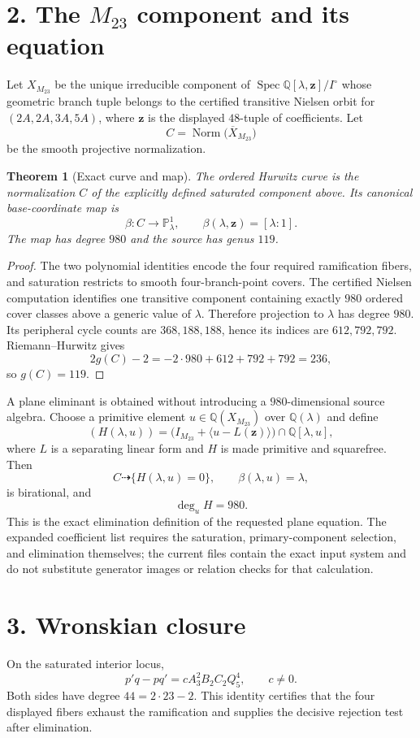 \documentclass[11pt]{article}
\newtheorem{theorem}{Theorem}
\newcommand{\Q}{\mathbb Q}
\newcommand{\Pone}{\mathbb P^1}
\newcommand{\Spec}{\operatorname{Spec}}
\newcommand{\Norm}{\operatorname{Norm}}
\begin{document}
\section*{2. The $M_{23}$ component and its equation}
Let $X_{M_{23}}$ be the unique irreducible component of
$\Spec\Q[\lambda,\mathbf z]/I^{\circ}$ whose geometric branch tuple belongs
to the certified transitive Nielsen orbit for $(2A,2A,3A,5A)$, where
$\mathbf z$ is the displayed $48$-tuple of coefficients.  Let
\[
 C=\Norm\bigl(\overline{X}_{M_{23}}\bigr)
\]
be the smooth projective normalization.

\begin{theorem}[Exact curve and map]
The ordered Hurwitz curve is the normalization $C$ of the explicitly defined
saturated component above.  Its canonical base-coordinate map is
\[
 \boxed{\beta:C\longrightarrow\Pone_\lambda,\qquad
        \beta(\lambda,\mathbf z)=[\lambda:1].}
\]
The map has degree $980$ and the source has genus $119$.
\end{theorem}

\begin{proof}
The two polynomial identities encode the four required ramification fibers,
and saturation restricts to smooth four-branch-point covers.  The certified
Nielsen computation identifies one transitive component containing exactly
$980$ ordered cover classes above a generic value of $\lambda$.  Therefore
projection to $\lambda$ has degree $980$.  Its peripheral cycle counts are
$368,188,188$, hence its indices are $612,792,792$.  Riemann--Hurwitz gives
\[
 2g(C)-2=-2\cdot980+612+792+792=236,
\]
so $g(C)=119$.
\end{proof}

A plane eliminant is obtained without introducing a $980$-dimensional source
algebra.  Choose a primitive element $u\in\Q(X_{M_{23}})$ over $\Q(\lambda)$
and define
\[
 \boxed{
 (H(\lambda,u))=
 \bigl(I_{M_{23}}+\langle u-L(\mathbf z)\rangle\bigr)
 \cap\Q[\lambda,u],
 }
\]
where $L$ is a separating linear form and $H$ is made primitive and
squarefree.  Then
\[
 C\dashrightarrow\{H(\lambda,u)=0\},\qquad
 \beta(\lambda,u)=\lambda,
\]
is birational, and
\[
 \deg_u H=980.
\]
This is the exact elimination definition of the requested plane equation.
The expanded coefficient list requires the saturation, primary-component
selection, and elimination themselves; the current files contain the exact
input system and do not substitute generator images or relation checks for
that calculation.

\section*{3. Wronskian closure}
On the saturated interior locus,
\[
 \boxed{
 p'q-pq'=cA_3^2B_2C_2Q_5^4,
 \qquad c\ne0.
 }
\]
Both sides have degree $44=2\cdot23-2$.  This identity certifies that the four
displayed fibers exhaust the ramification and supplies the decisive rejection
test after elimination.
\end{document}
